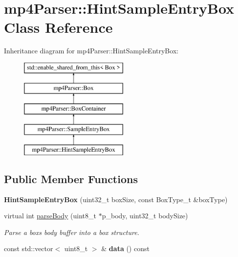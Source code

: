 \hypertarget{classmp4_parser_1_1_hint_sample_entry_box}{}\section{mp4\+Parser\+::Hint\+Sample\+Entry\+Box Class Reference}
\label{classmp4_parser_1_1_hint_sample_entry_box}
Inheritance diagram for mp4\+Parser\+::Hint\+Sample\+Entry\+Box\+:\begin{figure}[H]
\begin{center}
\leavevmode
\includegraphics[height=5.000000cm]{classmp4_parser_1_1_hint_sample_entry_box}
\end{center}
\end{figure}
\subsection*{Public Member Functions}
\begin{DoxyCompactItemize}
\item 
\mbox{\label{classmp4_parser_1_1_hint_sample_entry_box_a9cd826fdcf281a2b9f107e000ed10016}} 
{\bfseries Hint\+Sample\+Entry\+Box} (uint32\+\_\+t box\+Size, const Box\+Type\+\_\+t \&box\+Type)
\item 
virtual int \mbox{\hyperlink{classmp4_parser_1_1_hint_sample_entry_box_aa9a7e41f4bd9773fe31b867743d93d8f}{parse\+Body}} (uint8\+\_\+t $\ast$p\+\_\+body, uint32\+\_\+t body\+Size)
\begin{DoxyCompactList}\small\item\em Parse a box\textquotesingle{}s body buffer into a box structure. \end{DoxyCompactList}\item 
\mbox{\label{classmp4_parser_1_1_hint_sample_entry_box_a76549bab472cda3bfad5507ff6ed2297}} 
const std\+::vector$<$ uint8\+\_\+t $>$ \& {\bfseries data} () const
\end{DoxyCompactItemize}
